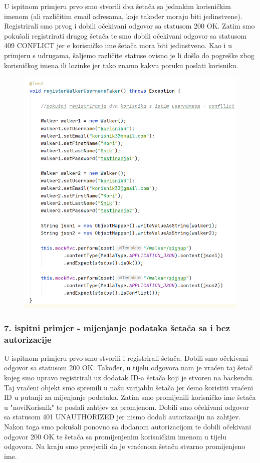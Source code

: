 			U ispitnom primjeru prvo smo stvorili dva šetača sa jednakim korisničkim imenom (ali različitim email adresama, koje također moraju biti jedinstvene). Registrirali smo prvog i dobili očekivani odgovor sa statusom 200 OK. Zatim smo pokušali registrirati drugog šetača te smo dobili  očekivani odgovor sa statusom 409 CONFLICT jer e korisničko ime šetača mora biti jedinstveno. Kao i u primjeru s udrugama, šaljemo različite statuse ovisno je li došlo do pogreške zbog korisničkog imena ili lozinke jer tako znamo kakvu poruku poslati korisniku.
			
			
			\begin{figure}[H]
				\centerline{
					\includegraphics[scale=0.75]{slike/walker2.PNG}} %
				\centering
			\end{figure}
			
			
			\subsubsection{7. ispitni primjer - mijenjanje podataka šetača sa i bez autorizacije }
			
			U ispitnom primjeru prvo smo stvorili i registrirali  šetača. Dobili smo očekivani odgovor sa statusom 200 OK. Također, u tijelu odgovora nam je vraćen taj šetač kojeg smo upravo registrirali uz dodatak ID-a šetača koji je stvoren na backendu. Taj vraćeni objekt smo spremili u našu varijablu šetača jer ćemo koristiti vraćeni ID u putanji za mijenjanje podataka. Zatim smo promijenili korisničko ime šetača u "noviKorisnik" te poslali zahtjev za promjenom. Dobili smo očekivani odgovor sa statusom 401 UNAUTHORIZED jer nismo dodali autorizaciju na zahtjev. Nakon toga smo pokušali ponovno sa dodanom autorizacijom te dobili očekivani odgovor 200 OK te šetača sa promijenjenim korisničkim imenom u tijelu odgovora. Na kraju smo provjerili da je vraćenom šetaču stvarno promijenjeno ime.
			
